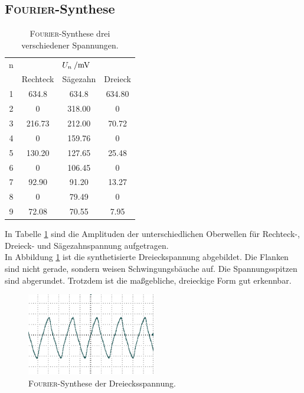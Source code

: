 \subsection{\textsc{Fourier}-Synthese}
\begin{table}
	\centering
	\begin{tabular}{cccc}	
	\toprule
\multicolumn{1}{c}{n} & \multicolumn{3}{c}{$U_n\:/\si{\milli{\volt}}$}\\
	{} & {Rechteck} & {Sägezahn} & {Dreieck}\\
	\midrule
 1 & 634.8  & 634.8  & 634.80\\
 2 &   0    & 318.00 &   0\\
 3 & 216.73 & 212.00 &  70.72\\
 4 &   0    & 159.76 &   0\\
 5 & 130.20 & 127.65 &  25.48\\
 6 &   0    & 106.45 &   0\\
 7 &  92.90 &  91.20 &  13.27\\
 8 &   0    &  79.49 &   0\\
 9 &  72.08 &  70.55 &  7.95\\
	\bottomrule
	\end{tabular}
	\caption{\textsc{Fourier}-Synthese drei verschiedener Spannungen.}
	\label{tab:FS}
\end{table}
In Tabelle \ref{tab:FS} sind die Amplituden der unterschiedlichen Oberwellen für Rechteck-, Dreieck- und Sägezahnspannung aufgetragen.\\
In Abbildung \ref{fig:1-9_DE} ist die synthetisierte Dreieckspannung abgebildet. 
Die Flanken sind nicht gerade, sondern weisen Schwingungsbäuche auf. Die Spannungsspitzen sind abgerundet. Trotzdem ist die maßgebliche, dreieckige Form gut erkennbar.
\begin{figure}
	\centering
		\includegraphics[width=0.5\textwidth]{Bilder/1-9_DE.pdf}		
\caption{\textsc{Fourier}-Synthese der Dreiecksspannung. \cite{gimp}}
	\label{fig:1-9_DE}
\end{figure}
